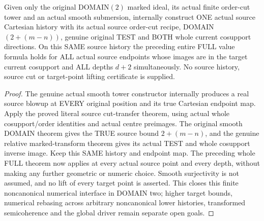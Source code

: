 \begin{theorem}
\label{hir:original-finite-order-cut-domain-two-one-smooth-history}
\leanok
Given only the original DOMAIN$(2)$ marked ideal, its actual finite
order-cut tower and an actual smooth submersion, internally construct ONE
actual source Cartesian history with its actual source order-cut recipe,
DOMAIN$(2+(m-n))$, genuine original TEST and BOTH whole current cosupport
directions. On this SAME source history the preceding entire FULL value
formula holds for ALL actual source endpoints whose images are in the
target current cosupport and ALL depths $d+2$ simultaneously. No source
history, source cut or target-point lifting certificate is supplied.
\end{theorem}
\begin{proof}
The genuine actual smooth tower constructor internally produces a real
source blowup at EVERY original position and its true Cartesian endpoint
map. Apply the proved literal source cut-transfer theorem, using actual
whole cosupport/order identities and actual centre preimages. The original
smooth DOMAIN theorem gives the TRUE source bound $2+(m-n)$, and the
genuine relative marked-transform theorem gives its actual TEST and whole
cosupport inverse image. Keep this SAME history and endpoint map. The
preceding whole FULL theorem now applies at every actual source point
and every depth, without making any further geometric or numeric choice.
Smooth surjectivity is not assumed, and no lift of every target point is
asserted. This closes this finite noncanonical numerical interface in
DOMAIN two; higher target bounds, numerical rebasing across arbitrary
noncanonical lower histories, transformed semicoherence and the global
driver remain separate open goals.
\end{proof}
